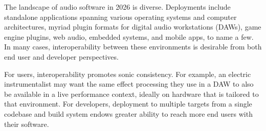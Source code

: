 \documentclass[a4paper]{article}
\begin{document}






The landscape of audio software in 2026 is diverse. Deployments include standalone applications spanning various operating systems and computer architectures, myriad plugin formats for digital audio workstations (DAWs), game engine plugins, web audio, embedded systems, and mobile apps, to name a few. In many cases, interoperability between these environments is desirable from both end user and developer perspectives. 

For users, interoperability promotes sonic consistency. For example, an electric instrumentalist may want the same effect processing they use in a DAW to also be available in a live performance context, ideally on hardware that is tailored to that environment. For developers, deployment to multiple targets from a single codebase and build system endows greater ability to reach more end users with their software.
\end{document}
